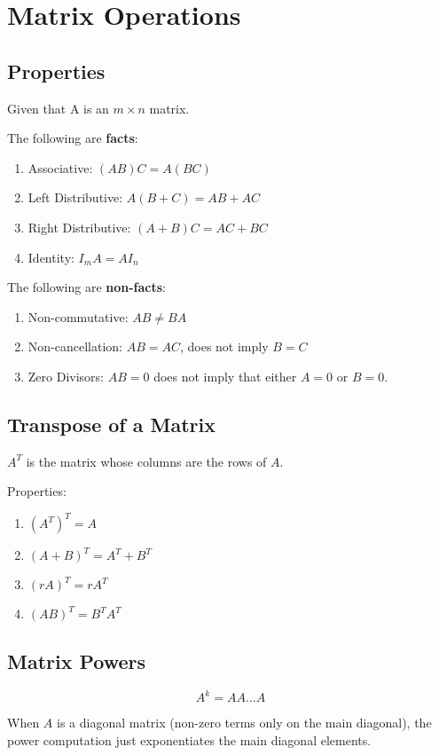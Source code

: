 \section{Matrix Operations}
\subsection{Properties}
\noindent
Given that A is an \(m \times n\) matrix.

\noindent
\newline
The following are \textbf{facts}:
\begin{enumerate}
    \item Associative: \((AB)C = A(BC)\)
    \item Left Distributive: \(A(B+C) = AB + AC\)
    \item Right Distributive: \((A+B)C = AC + BC\)
    \item Identity: \(I_m A = A I_n\)
\end{enumerate}

\noindent
\newline
The following are \textbf{non-facts}:
\begin{enumerate}
    \item Non-commutative: \(AB \ne BA\)
    \item Non-cancellation: \(AB = AC\), does not imply \(B=C\)
    \item Zero Divisors: \(AB = 0\) does not imply that either \(A=0\) or \(B=0\).
\end{enumerate}

\subsection{Transpose of a Matrix}
\noindent
\(A^T\) is the matrix whose columns are the rows of \(A\).

\noindent
\newline
Properties:

\begin{enumerate}
    \item \((A^T)^T=A\)
    \item \((A+B)^T = A^T + B^T\)
    \item \((rA)^T = rA^T\)
    \item \((AB)^T = B^T A^T\)
\end{enumerate}

\subsection{Matrix Powers}
\begin{equation}
    A^k = AA\dots A
\end{equation}

\noindent
\newline
When \(A\) is a diagonal matrix (non-zero terms only on the main diagonal), the power computation just exponentiates the main diagonal elements.